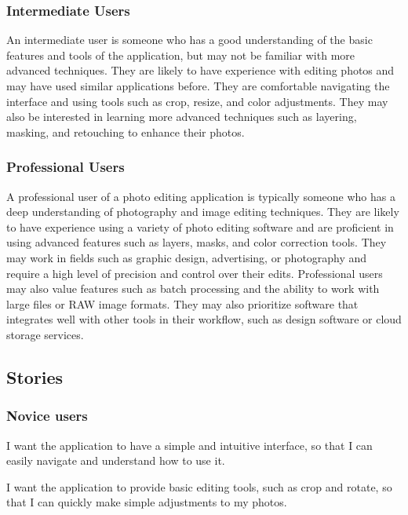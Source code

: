 \documentclass[11pt,a4paper]{article}
\begin{document}
\subsubsection*{Intermediate Users}

An intermediate user is someone who has a good understanding of the basic
features and tools of the application, but may not be familiar with more
advanced techniques. They are likely to have experience with editing photos and
may have used similar applications before. They are comfortable navigating the
interface and using tools such as crop, resize, and color adjustments. They may
also be interested in learning more advanced techniques such as layering,
masking, and retouching to enhance their photos. 

\subsubsection*{Professional Users}

A professional user of a photo editing application is typically someone who has
a deep understanding of photography and image editing techniques. They are
likely to have experience using a variety of photo editing software and are
proficient in using advanced features such as layers, masks, and color
correction tools. They may work in fields such as graphic design, advertising,
or photography and require a high level of precision and control over their
edits. Professional users may also value features such as batch processing and
the ability to work with large files or RAW image formats. They may also
prioritize software that integrates well with other tools in their workflow,
such as design software or cloud storage services.

\pagebreak

\subsection*{Stories}

\subsubsection*{Novice users}

I want the application to have a simple and intuitive interface, so that I can
easily navigate and understand how to use it.

I want the application to provide basic editing tools, such as crop and rotate,
so that I can quickly make simple adjustments to my photos.
\end{document}
